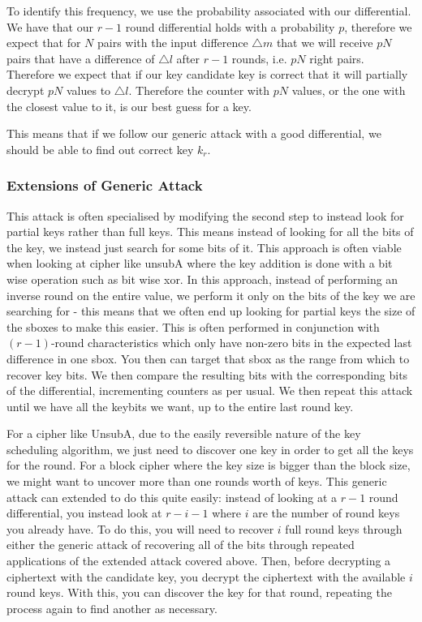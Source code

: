 \documentclass[12pt,a4paper]{article}
\begin{document}
To identify this frequency, we use the probability associated with our
differential. We have that our $r-1$ round differential holds with a
probability $p$, therefore we expect that for $N$ pairs with the input
difference $\triangle m$ that we will receive $pN$ pairs that have a
difference of $\triangle l$ after $r-1$ rounds, i.e. $pN$ right pairs.
Therefore we expect that if our key candidate key is correct that it will
partially decrypt $pN$ values to $\triangle l$.  Therefore the counter with
$pN$ values, or the one with the closest value to it, is our best guess for a
key.

This means that if we follow our generic attack with a good differential, we
should be able to find out correct key $k_r$.

\subsubsection{Extensions of Generic Attack}
\label{sec:exten_gen}
This attack is often specialised by modifying the second step to instead look
for partial keys rather than full keys. This means instead of looking for all
the bits of the key, we instead just search for some bits of it. This approach
is often viable when looking at cipher like unsubA where the key addition is
done with a bit wise operation such as bit wise xor. In this approach, instead of
performing an inverse round on the entire value, we perform it only on the bits
of the key we are searching for - this means that we often end up looking for
partial keys the size of the sboxes to make this easier. This is often performed
in conjunction with $(r-1)$-round characteristics which only have non-zero bits
in the expected last difference in one sbox. You then can target that sbox as
the range from which to recover key bits. We then compare the
resulting bits with the corresponding bits of the differential, incrementing
counters as per usual. We then repeat this attack until we have all the
keybits we want, up to the entire last round key.

For a cipher like UnsubA, due to the easily reversible nature of the key
scheduling algorithm, we just need to discover one key in order to get all the
keys for the round. For a block cipher where the key size is bigger than the
block size, we might want to uncover more than one rounds worth of keys. This
generic attack can extended to do this quite easily: instead of looking at a $r-1$
round differential, you instead look at $r-i-1$ where $i$ are the number of
round keys you already have. To do this, you will need to recover $i$ full
round keys through either the generic attack of recovering all of the bits
through repeated applications of the extended attack covered above. Then,
before decrypting a ciphertext with the candidate key, you decrypt the
ciphertext with the available $i$ round keys. With this, you can discover the
key for that round, repeating the process again to find another as necessary.
\end{document}
